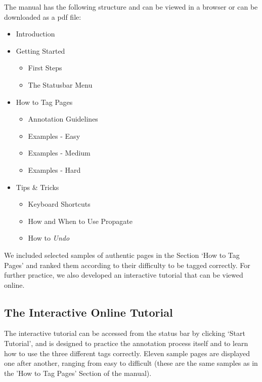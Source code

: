 \documentclass[12pt,a4paper]{article}
\begin{document}
The manual has the following structure and can be viewed in a browser or can be downloaded as a pdf file\footnotemark[\value{footnote}]:


\begin{itemize}
	\item Introduction
	\item Getting Started
		\begin{itemize}
			\item First Steps
			\item The Statusbar Menu
		\end{itemize}
	\item How to Tag Pages
		\begin{itemize}
			\item Annotation Guidelines
			\item Examples - Easy
			\item Examples - Medium
			\item Examples - Hard
		\end{itemize}
	\item Tips \& Tricks
		\begin{itemize}
			\item Keyboard Shortcuts
			\item How and When to Use Propagate
			\item How to \textit{Undo}
		\end{itemize}
	
\end{itemize}

We included selected samples of authentic pages in the Section `How to Tag Pages' and ranked them according to their difficulty to be tagged correctly. 
For further practice, we also developed an interactive tutorial that can be viewed online.


\subsection{The Interactive Online Tutorial}

The interactive tutorial can be accessed from the status bar by clicking `Start Tutorial', and is designed to practice the annotation process itself and to learn how to use the three different tags correctly. 
Eleven sample pages are displayed one after another, ranging from easy to difficult (these are the same samples as in the 'How to Tag Pages' Section of the manual).
\end{document}
